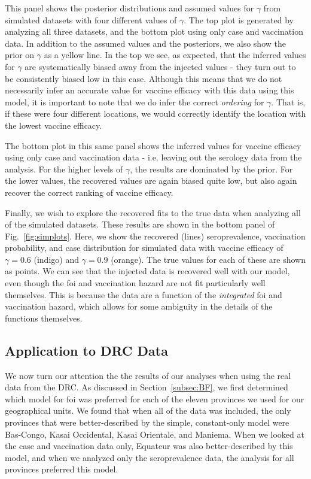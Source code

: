 \documentclass[nofootinbib,aps,pre,twocolumn,superscriptaddress,showkeys,showpacs]{revtex4-1}
\begin{document}
This panel shows the posterior distributions and assumed values for $\gamma$ from simulated datasets with four different values of $\gamma$. The top plot is generated by analyzing all three datasets, and the bottom plot using only case and vaccination data. In addition to the assumed values and the posteriors, we also show the prior on $\gamma$ as a yellow line. In the top we see, as expected, that the inferred values for $\gamma$ are systematically biased away from the injected values - they turn out to be consistently biased low in this case. Although this means that we do not necessarily infer an accurate value for vaccine efficacy with this data using this model, it is important to note that we do infer the correct \emph{ordering} for $\gamma$. That is, if these were four different locations, we would correctly identify the location with the lowest vaccine efficacy.

The bottom plot in this same panel shows the inferred values for vaccine efficacy using only case and vaccination data - i.e. leaving out the serology data from the analysis. For the higher levels of $\gamma$, the results are dominated by the prior. For the lower values, the recovered values are again biased quite low, but also again recover the correct ranking of vaccine efficacy.

Finally, we wish to explore the recovered fits to the true data when analyzing all of the simulated datasets. These results are shown in the bottom panel of Fig.~\ref{fig:simplots}. Here, we show the recovered (lines) seroprevalence, vaccination probability, and case distribution for simulated data with vaccine efficacy of $\gamma = 0.6$ (indigo) and $\gamma = 0.9$ (orange). The true values for each of these are shown as points. We can see that the injected data is recovered well with our model, even though the foi and vaccination hazard are not fit particularly well themselves. This is because the data are a function of the \emph{integrated} foi and vaccination hazard, which allows for some ambiguity in the details of the functions themselves. 

\subsection{Application to DRC Data \label{subsec:DRC}}
We now turn our attention the the results of our analyses when using the real data from the DRC. As discussed in Section~\ref{subsec:BF}, we first determined which model for foi was preferred for each of the eleven provinces we used for our geographical units. We found that when all of the data was included, the only provinces that were better-described by the simple, constant-only model were Bas-Congo, Kasai Occidental, Kasai Orientale, and Maniema. When we looked at the case and vaccination data only, Equateur was also better-described by this model, and when we analyzed only the seroprevalence data, the analysis for all provinces preferred this model. 
\end{document}
